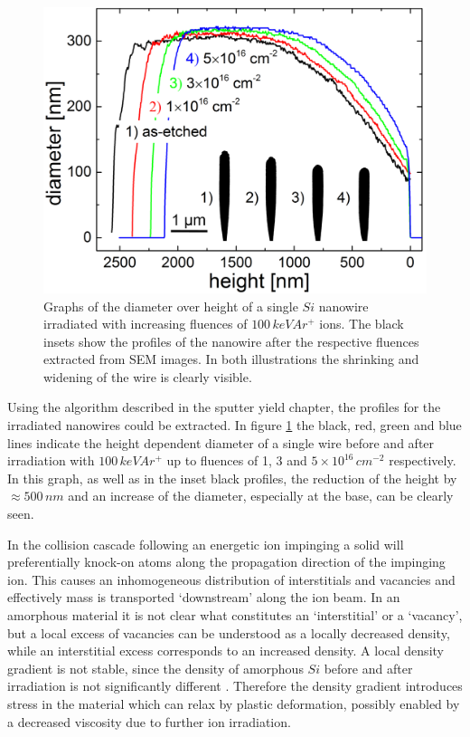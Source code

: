 \documentclass[12pt,
paper=a4,				
DIV=calc,		  %
BCOR=16mm,	  %
headinclude,
openany
]{scrbook}
\begin{document}
\begin{figure}
	\centering
		\includegraphics[width=.48\textwidth]{images/deformationprofile.jpg}
	\caption{Graphs of the diameter over height of a single $Si$ nanowire irradiated with increasing fluences of $100\,keV Ar^+$ ions. The black insets show the profiles of the nanowire after the respective fluences extracted from SEM images. In both illustrations the shrinking and widening of the wire is clearly visible.} 
	\label{deformationprofile}
\end{figure}

Using the algorithm described in the sputter yield chapter, the profiles for the irradiated nanowires could be extracted. In figure \ref{deformationprofile} the black, red, green and blue lines indicate the height dependent diameter of a single wire before and after irradiation with $100\,keV Ar^+$ up to fluences of 1, 3 and $5 \times 10^{16}\,cm^{-2}$ respectively. In this graph, as well as in the inset black profiles, the reduction of the height by $\approx 500\,nm$ and an increase of the diameter, especially at the base, can be clearly seen.

In the collision cascade following an energetic ion impinging a solid will preferentially knock-on atoms along the propagation direction of the impinging ion. This causes an inhomogeneous distribution of interstitials and vacancies and effectively mass is transported `downstream' along the ion beam. In an amorphous material it is not clear what constitutes an `interstitial' or a `vacancy', but a local excess of vacancies can be understood as a locally decreased density, while an interstitial excess corresponds to an increased density. A local density gradient is not stable, since the density of amorphous $Si$ before and after irradiation is not significantly different \cite{pelaz_ion-beam-induced_2004}. Therefore the density gradient introduces stress in the material which can relax by plastic deformation, possibly enabled by a decreased viscosity due to further ion irradiation. 
\end{document}
